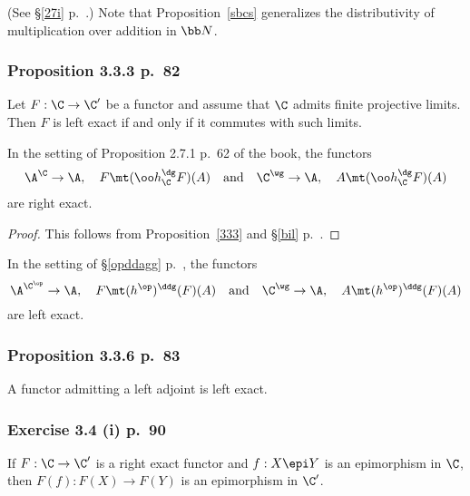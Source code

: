 \documentclass[12pt]{article}
\theoremstyle{remark}
\theoremstyle{definition}
\begin{document}
(See \S\ref{27i} p.~.) Note that Proposition~\ref{sbcs} generalizes the distributivity of multiplication over addition in $\bb N$.

\subsubsection{Proposition 3.3.3 p.~82}

\begin{prop}[Proposition 3.3.3 p.~82]
Let $F:\C\to\C'$ be a functor and assume that $\C$ admits finite projective limits. Then $F$ is left exact if and only if it commutes with such limits.
\end{prop}

\begin{cor}
In the setting of Proposition 2.7.1 p.~62 of the book, the functors
$$
\A^\C\to\A,\quad F\mt(\oo h_\C^\dg F)(A)\quad\text{and}\quad
\C^\wg\to\A,\quad A\mt(\oo h_\C^\dg F)(A)
$$ 
are right exact. 
\end{cor}

\begin{proof}
This follows from Proposition~\ref{333} and \S\ref{bil} p.~.
\end{proof} 

\begin{cor}
In the setting of \S\ref{opddagg} p.~, the functors
$$
\A^{\C^{\op}}\to\A,\quad F\mt(h^{\op})^\ddg(F)(A)\quad\text{and}\quad
\C^\wg\to\A,\quad A\mt(h^{\op})^\ddg(F)(A)
$$ 
are left exact. 
\end{cor} 

\subsubsection{Proposition 3.3.6 p.~83}

\begin{prop}[Proposition 3.3.6 p.~83]
A functor admitting a left adjoint is left exact.
\end{prop}

\subsubsection{Exercise 3.4 (i) p.~90}

\begin{prop}[Exercise 3.4 (i) p.~90]
If $F:\C\to\C'$ is a right exact functor and $f:X\epi Y$ is an epimorphism in $\C$, then $F(f):F(X)\to F(Y)$ is an epimorphism in $\C'$.
\end{prop}
\end{document}
